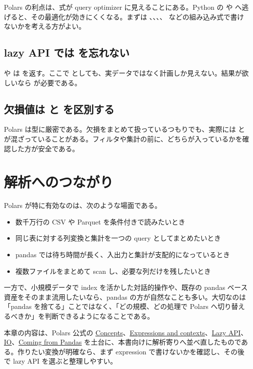 Polars の利点は、式が query optimizer に見えることにある。Python の  や  へ逃げると、その最適化が効きにくくなる。まずは 、、、、 などの組み込み式で書けないかを考える方がよい。

\subsection{lazy API では  を忘れない}

 や  は  を返す。ここで  としても、実データではなく計画しか見えない。結果が欲しいなら  が必要である。

\subsection{欠損値は  と  を区別する}

Polars は型に厳密である。欠損をまとめて扱っているつもりでも、実際には  と  が混ざっていることがある。フィルタや集計の前に、どちらが入っているかを確認した方が安全である。

\section{解析へのつながり}

Polars が特に有効なのは、次のような場面である。

\begin{itemize}
\item 数千万行の CSV や Parquet を条件付きで読みたいとき
\item 同じ表に対する列変換と集計を一つの query としてまとめたいとき
\item pandas では待ち時間が長く、入出力と集計が支配的になっているとき
\item 複数ファイルをまとめて scan し、必要な列だけを残したいとき
\end{itemize}

一方で、小規模データで index を活かした対話的操作や、既存の pandas ベース資産をそのまま流用したいなら、pandas の方が自然なことも多い。大切なのは「pandas を捨てる」ことではなく、「どの規模、どの処理で Polars へ切り替えるべきか」を判断できるようになることである。

本章の内容は、Polars 公式の \href{https://docs.pola.rs/user-guide/concepts/}{Concepts}、\href{https://docs.pola.rs/user-guide/concepts/expressions-and-contexts/}{Expressions and contexts}、\href{https://docs.pola.rs/user-guide/concepts/lazy-api/}{Lazy API}、\href{https://docs.pola.rs/user-guide/io/}{IO}、\href{https://docs.pola.rs/user-guide/migration/pandas/}{Coming from Pandas} を土台に、本書向けに解析寄りへ並べ直したものである。作りたい変換が明確なら、まず expression で書けないかを確認し、その後で lazy API を選ぶと整理しやすい。
